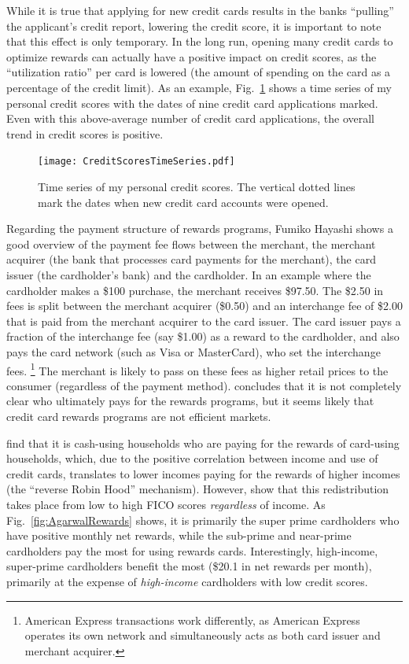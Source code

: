 While it is true that applying for new credit cards results in the banks ``pulling'' the applicant's credit report, lowering the credit score, it is important to note that this effect is only temporary. In the long run, opening many credit cards to optimize rewards can actually have a positive impact on credit scores, as the ``utilization ratio'' per card is lowered (the amount of spending on the card as a percentage of the credit limit). 
As an example, Fig.~\ref{fig:FICOTimeline} shows a time series of my personal credit scores with the dates of nine credit card applications marked. Even with this above-average number of credit card applications, the overall trend in credit scores is positive.

\begin{figure}[t!h]
    \begin{center}
    \texttt{[image: CreditScoresTimeSeries.pdf]}
    \caption{Time series of my personal credit scores. The vertical dotted lines mark the dates when new credit card accounts were opened.}
    \label{fig:FICOTimeline}
    \end{center}
\end{figure}

Regarding the payment structure of rewards programs, Fumiko Hayashi \citeyearpar{hayashi:2009} shows a good overview of the payment fee flows between the merchant, the merchant acquirer (the bank that processes card payments for the merchant), the card issuer (the cardholder's bank) and the cardholder.
In an example where the cardholder makes a \$100 purchase, the merchant receives \$97.50. The \$2.50 in fees is split between the merchant acquirer (\$0.50) and an interchange fee of \$2.00 that is paid from the merchant acquirer to the card issuer. The card issuer pays a fraction of the interchange fee (say \$1.00) as a reward to the cardholder, and also pays the card network (such as Visa or MasterCard), who set the interchange fees.%
\footnote{American Express transactions work differently, as American Express operates its own network and simultaneously acts as both card issuer and merchant acquirer.}
The merchant is likely to pass on these fees as higher retail prices to the consumer (regardless of the payment method). \citet{hayashi:2009} concludes that it is not completely clear who ultimately pays for the rewards programs, but it seems likely that credit card rewards programs are not efficient markets. 

\citet*{schuetal:2010} find that it is cash-using households who are paying for the rewards of card-using households, which, due to the positive correlation between income and use of credit cards, translates to lower incomes paying for the rewards of higher incomes (the ``reverse Robin Hood'' mechanism). 
However, \citet*{agaretal:2023} show that this redistribution takes place from low to high FICO scores \emph{regardless} of income.
As Fig.~\ref{fig:AgarwalRewards} shows, it is primarily the super prime cardholders who have positive monthly net rewards, while the sub-prime and near-prime cardholders pay the most for using rewards cards. Interestingly, high-income, super-prime cardholders benefit the most (\$20.1 in net rewards per month), primarily at the expense of \emph{high-income} cardholders with low credit scores.

